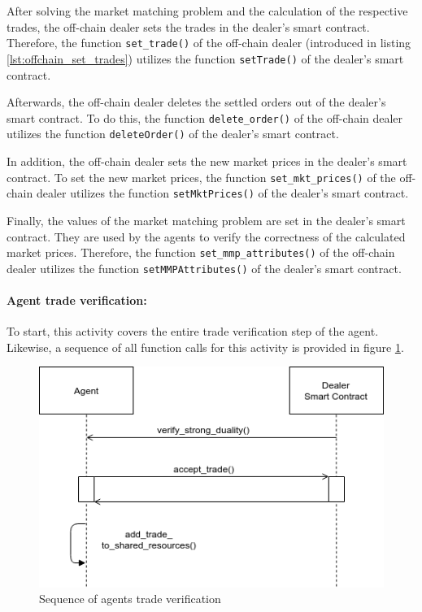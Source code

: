 After solving the market matching problem and the calculation of the respective 
trades, the off-chain dealer sets the trades in the dealer's smart contract.
Therefore, the function \verb|set_trade()| of the off-chain dealer (introduced in listing \ref{lst:offchain_set_trades})
utilizes the function \verb|setTrade()| of the dealer's smart contract.

Afterwards, the off-chain dealer deletes the settled orders out of the dealer's
smart contract. 
To do this, the function \verb|delete_order()| of the off-chain dealer
utilizes the function \verb|deleteOrder()| of the dealer's smart contract.

In addition, the off-chain dealer sets the new market prices in the dealer's smart contract.
To set the new market prices, the function \verb|set_mkt_prices()| of the off-chain dealer 
utilizes the function \verb|setMktPrices()| of the dealer's smart contract.

Finally, the values of the market matching problem are set in the dealer's smart contract. 
They are used by the agents to verify the correctness of the calculated market prices.
Therefore, the function \verb|set_mmp_attributes()| of the off-chain dealer
utilizes the function \verb|setMMPAttributes()| of the dealer's smart contract.

\paragraph{Agent trade verification:}
To start, this activity covers the entire trade verification step of the agent. 
Likewise, a sequence of all function 
calls for this activity is provided in figure \ref{figure:agents_trade_verification}.

\begin{figure}[htbp]
	\centering
	\includegraphics[width=.8\linewidth]{./figures/trade_verification.png}
	\caption{Sequence of agents trade verification}
	\label{figure:agents_trade_verification}
\end{figure}

